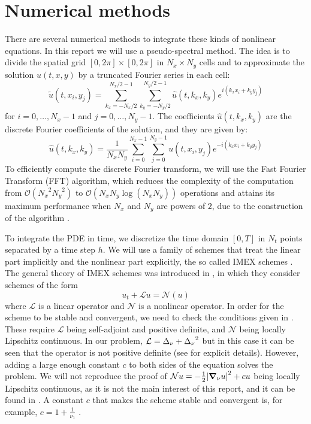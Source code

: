 \documentclass[twoside]{article}
\begin{document}
\section{Numerical methods}

There are several numerical methods to integrate these kinds of nonlinear equations. In this report we will use a pseudo-spectral method. The idea is to divide the spatial grid $[0,2\pi]\times [0,2\pi]$ in $N_x \times N_y$ cells and to approximate the solution $u(t,x,y)$ by a truncated Fourier series in each cell:
\begin{equation}\label{eq:idft}
  \tilde{u}(t,x_i,y_j) = \sum_{k_x=-N_x/2}^{N_x/2-1} \sum_{k_y=-N_y/2}^{N_y/2-1} \hat{u}(t,k_x,k_y) e^{i(k_x x_i + k_y y_j)}
\end{equation}
for $i=0,\dots,N_x-1$ and $j=0,\dots,N_y-1$. The coefficients $\hat{u}(t,k_x,k_y)$ are the discrete Fourier coefficients of the solution, and they are given by:
\begin{equation}\label{eq:dft}
  \hat{u}(t,k_x,k_y) = \frac{1}{N_x N_y} \sum_{i=0}^{N_x-1} \sum_{j=0}^{N_y-1} u(t,x_i,y_j) e^{-i(k_x x_i + k_y y_j)}
\end{equation}
To efficiently compute the discrete Fourier transform, we will use the Fast Fourier Transform (FFT) algorithm, which reduces the complexity of the computation from $\mathcal{O}({N_x}^2 {N_y}^2)$ to $\mathcal{O}(N_x N_y \log(N_x N_y))$ operations and attains its maximum performance when $N_x$ and $N_y$ are powers of $2$, due to the construction of the algorithm \cite{fft}.

To integrate the PDE in time, we discretize the time domain $[0,T]$ in $N_t$ points separated by a time step $h$. We will use a family of schemes that treat the linear part implicitly and the nonlinear part explicitly, the so called IMEX schemes \cite{Akriviskuramoto}. The general theory of IMEX schemes was introduced in \cite{Akrivis2004}, in which they consider schemes of the form
\begin{equation}\label{eq:nonlinear_pde}
  u_t+\mathcal{L}u=\mathcal{N}(u)
\end{equation}
where $\mathcal{L}$ is a linear operator and $\mathcal{N}$ is a nonlinear operator. In order for the scheme to be stable and convergent, we need to check the conditions given in \cite{Akrivis2004}. These require $\mathcal{L}$ being self-adjoint and positive definite, and $\mathcal{N}$ being locally Lipschitz continuous. In our problem, $\mathcal{L}=\Delta_\nu + {\Delta_\nu}^2$ but in this case it can be seen that the operator is not positive definite (see \cite{phdthesis_anna} for explicit details). However, adding a large enough constant $c$ to both sides of the equation solves the problem. We will not reproduce the proof of $\mathcal{N}u=-\frac{1}{2} \abs{\grad_\nu u}^2 + cu$ being locally Lipschitz continuous, as it is not the main interest of this report, and it can be found in \cite{Akriviskuramoto}. A constant $c$ that makes the scheme stable and convergent is, for example, $c=1+\frac{1}{\nu_1}$ \cite{phdthesis_anna}.
\end{document}
